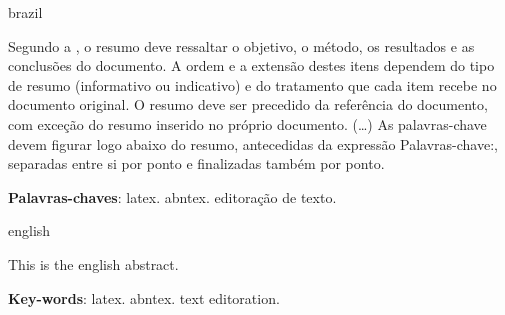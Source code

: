 
%
\begin{otherlanguage*}{brazil}
\begin{resumo}

	Segundo a , o resumo deve ressaltar o
	objetivo, o método, os resultados e as conclusões do documento. A ordem e a extensão
	destes itens dependem do tipo de resumo (informativo ou indicativo) e do
	tratamento que cada item recebe no documento original. O resumo deve ser
	precedido da referência do documento, com exceção do resumo inserido no
	próprio documento. (\ldots) As palavras-chave devem figurar logo abaixo do
	resumo, antecedidas da expressão Palavras-chave:, separadas entre si por
	ponto e finalizadas também por ponto.

\vspace{\onelineskip}
\noindent \textbf{Palavras-chaves}: latex. abntex. editoração de texto.

\end{resumo}
\end{otherlanguage*}


\begin{otherlanguage*}{english}
\begin{resumo}[Abstract]

	This is the english abstract.

	\vspace{\onelineskip}
	\noindent\textbf{Key-words}: latex. abntex. text editoration.

\end{resumo}
\end{otherlanguage*}


%
%
%
%
%
%


